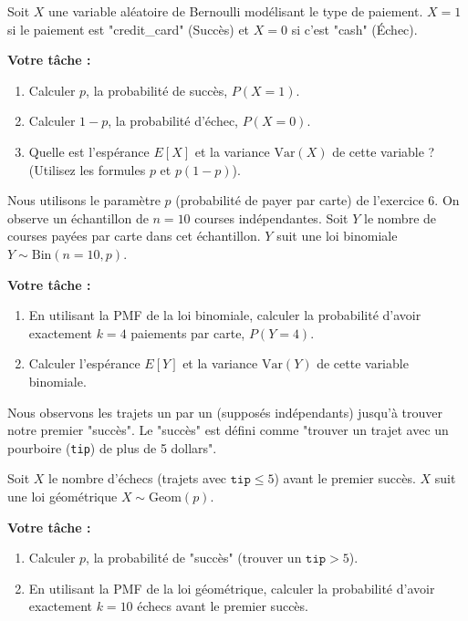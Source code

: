 \begin{exercicebox}
Soit $X$ une variable aléatoire de Bernoulli modélisant le type de paiement.
$X=1$ si le paiement est "credit\_card" (Succès) et $X=0$ si c'est "cash" (Échec).

\textbf{Votre tâche :}
\begin{enumerate}
    \item Calculer $p$, la probabilité de succès, $P(X=1)$.
    \item Calculer $1-p$, la probabilité d'échec, $P(X=0)$.
    \item Quelle est l'espérance $E[X]$ et la variance $\text{Var}(X)$ de cette variable ? (Utilisez les formules $p$ et $p(1-p)$).
\end{enumerate}
\end{exercicebox}

\begin{exercicebox}
Nous utilisons le paramètre $p$ (probabilité de payer par carte) de l'exercice 6.
On observe un échantillon de $n=10$ courses indépendantes. Soit $Y$ le nombre de courses payées par carte dans cet échantillon. $Y$ suit une loi binomiale $Y \sim \text{Bin}(n=10, p)$.

\textbf{Votre tâche :}
\begin{enumerate}
    \item En utilisant la PMF de la loi binomiale, calculer la probabilité d'avoir exactement $k=4$ paiements par carte, $P(Y=4)$.
    \item Calculer l'espérance $E[Y]$ et la variance $\text{Var}(Y)$ de cette variable binomiale.
\end{enumerate}
\end{exercicebox}

\begin{exercicebox}
Nous observons les trajets un par un (supposés indépendants) jusqu'à trouver notre premier "succès". 
Le "succès" est défini comme "trouver un trajet avec un pourboire (\texttt{tip}) de plus de 5 dollars".

Soit $X$ le nombre d'échecs (trajets avec $\texttt{tip} \le 5$) avant le premier succès. $X$ suit une loi géométrique $X \sim \text{Geom}(p)$.

\textbf{Votre tâche :}
\begin{enumerate}
    \item Calculer $p$, la probabilité de "succès" (trouver un $\texttt{tip} > 5$).
    \item En utilisant la PMF de la loi géométrique, calculer la probabilité d'avoir exactement $k=10$ échecs avant le premier succès.
\end{enumerate}
\end{exercicebox}

